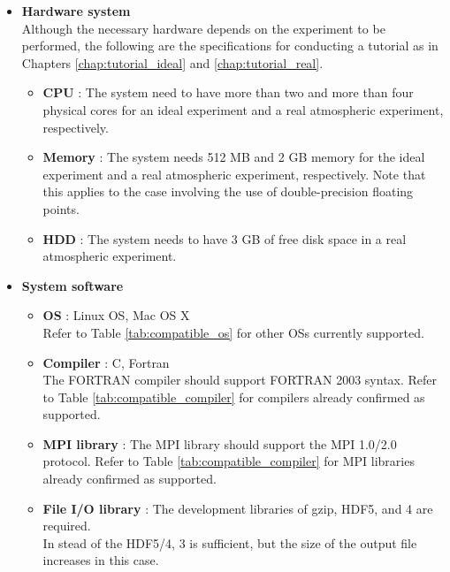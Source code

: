 \begin{itemize}
  \item {\bf Hardware system}\\
  Although the necessary hardware depends on the experiment to be performed,
the following are the specifications for conducting a tutorial as in Chapters \ref{chap:tutorial_ideal} and \ref{chap:tutorial_real}.
  \begin{itemize}
    \item {\bf CPU} : 
    The system need to have more than two and more than four physical cores
    for an ideal experiment and a real atmospheric experiment, respectively. 
    \item {\bf Memory} : 
    The system needs 512 MB and 2 GB memory 
    for the ideal experiment and a real atmospheric experiment, respectively.
    Note that this applies to the case involving the use of double-precision floating points.
    \item {\bf HDD} : The system needs to have 3 GB of free disk space in a real atmospheric experiment.
  \end{itemize}
  \item {\bf System software}
  \begin{itemize}
  \item {\bf OS} : Linux OS, Mac OS X\\
  Refer to Table \ref{tab:compatible_os} for other OSs currently supported.
  \item {\bf Compiler} : C, Fortran\\
  The FORTRAN compiler should support FORTRAN 2003 syntax.
  Refer to Table \ref{tab:compatible_compiler} for compilers already confirmed as supported.
  \item {\bf MPI library} : 
  The MPI library should support the MPI 1.0/2.0 protocol.  Refer to Table \ref{tab:compatible_compiler} for MPI libraries already confirmed as supported.
  \item {\bf File I/O library} : 
  The development libraries of gzip, HDF5, and {\netcdf}4 are required.\\
  In stead of the HDF5/{\netcdf}4, {\netcdf}3 is sufficient, but the size of the output file increases in this case.
  \end{itemize}
\end{itemize}


